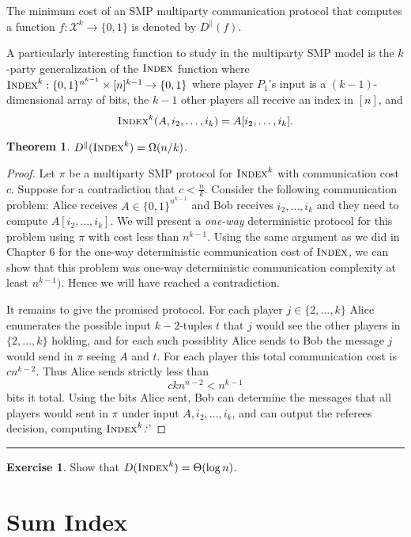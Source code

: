 \documentclass[11pt]{amsart}
\theoremstyle{plain}
\newtheorem{theorem}{Theorem}
\theoremstyle{definition}
\newtheorem{exercise}{Exercise}
\theoremstyle{plain}
\newcommand{\calX}{\mathcal{X}}
\newcommand{\Index}{\textsc{Index}}
\newcommand{\exercises}{\bigskip \noindent\rule{8cm}{0.4pt} \medskip}
\begin{document}
The minimum cost of an SMP multiparty communication protocol that computes a function $f : \calX^k \to \{0,1\}$ is denoted by $D^\parallel(f)$.

A particularly interesting function to study in the multiparty SMP model is the $k$-party generalization of the $\Index$ function where $\Index^k : \{0,1\}^{n^{k-1}} \times [n]^{k-1} \to \{0,1\}$ where player $P_1$'s input is a $(k-1)$-dimensional array of bits, the $k-1$ other players all receive an index in $[n]$, and
\[
\Index^k(A,i_2,\ldots,i_k) = A[i_2,\ldots,i_k].
\]

\begin{theorem}
$D^\parallel(\Index^k) = \Omega(n/k)$.
\end{theorem}

\begin{proof}
Let $\pi$ be a multiparty SMP protocol for $\Index^k$ with communication cost $c$. Suppose for a contradiction that $c < \frac{n}{k}$. Consider the following communication problem: Alice receives $A \in \{0,1\}^{n^{k-1}}$ and Bob receives $i_2,\dots, i_k$ and they need to compute $A[i_2,\dots, i_k]$. We will present a \emph{one-way} deterministic protocol for this problem using $\pi$ with cost less than $n^{k-1}$. Using the same argument as we did in Chapter $6$ for the one-way deterministic communication cost of $\Index$, we can show that this problem was one-way deterministic communication complexity at least $n^{{k-1}})$. Hence we will have reached a contradiction.

It remains to give the promised protocol. For each player $j \in \{2, \dots, k\}$ Alice enumerates the possible input $k-2$-tuples $t$ that $j$ would see the other players in $\{2,\dots, k\}$ holding, and for each such possiblity Alice sends to Bob the message $j$ would send in $\pi$ seeing $A$ and $t$. For each player this total communication cost is $cn^{k-2}$. Thus Alice sends strictly less than
$$ckn^{n-2} < n^{k-1}$$
bits it total.
Using the bits Alice sent, Bob can determine the messages that all players would sent in $\pi$ under input $A,i_2,\dots, i_k$, and can output the referees decision, computing $\Index^k$.`'
\end{proof}

\exercises

\begin{exercise}
Show that $D(\Index^k) = \Theta(\log n)$.
\end{exercise}


\newpage 
\section{Sum Index}
\end{document}
